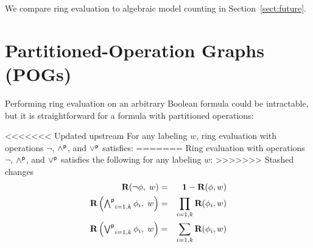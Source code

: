 \documentclass[letterpaper,USenglish,cleveref, autoref, thm-restate]{lipics-v2021}
\newcommand{\pand}{\mathbin{\land^{\sf p}}}
\newcommand{\por}{\mathbin{\lor^{\sf p}}}
\DeclareMathOperator*{\Pand}{\bigwedge^{\sf p}}
\DeclareMathOperator*{\Por}{\bigvee^{\sf p}}
\newcommand{\boolnot}{\neg}
\newcommand{\rep}{\textbf{R}}
\newcommand{\mulident}{\textbf{1}}
\begin{document}
We compare ring evaluation to algebraic model counting in Section~\ref{sect:future}.

\section{Partitioned-Operation Graphs (POGs)}

Performing ring evaluation on an arbitrary Boolean formula could be intractable, but it is straightforward for a formula with partitioned operations:
\begin{proposition}
<<<<<<< Updated upstream
For any labeling $w$, ring evaluation with operations $\boolnot$, $\pand$, and $\por$ satisfies:
=======
\label{prop:ring:eval}
Ring evaluation with operations $\boolnot$, $\pand$, and $\por$ satisfies the following for any labeling $w$:
>>>>>>> Stashed changes
\begin{eqnarray}
\textstyle
\rep(\boolnot \phi,\; w) &=& \mulident - \rep(\phi, w) \label{eqn:ring:negation} \\
\textstyle
\rep\left(\Pand_{i=1,k} \phi_i,\; w \right) &=& \prod_{i=1,k} \rep(\phi_i, w) \label{eqn:ring:product} \\
\textstyle
\rep\left(\Por_{i=1,k} \phi_i,\; w\right) &=& \sum_{i=1,k} \rep(\phi_i, w) \label{eqn:ring:sum}
\end{eqnarray}
\end{proposition}
\end{document}
